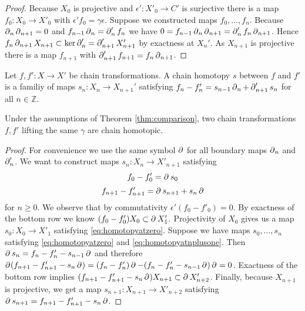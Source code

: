 \begin{proof}
Because $X_0$ is projective and $\epsilon': X'_0 \to C'$ is surjective there is a map $f_0:X_0\to X'_0$ with $\epsilon' f_0 = \gamma \epsilon$.
Suppose we constructed maps $f_0, \dots, f_n$.
Because $\operatorname{\partial}_{n}\operatorname{\partial}_{n+1} = 0$ and $f_{n-1}\operatorname{\partial}_{n}= \operatorname{\partial}_{n}'f_n$ we have $0 = f_{n-1}\operatorname{\partial}_{n}\operatorname{\partial}_{n+1} = \operatorname{\partial}_{n}'f_n\operatorname{\partial}_{n+1}$.
Hence $f_n \operatorname{\partial}_{n+1}X_{n+1} \subset \ker\operatorname{\partial}_{n}' = \operatorname{\partial}_{n+1}'X_{n+1}'$ by exactness at $X_{n}'$.
As $X_{n+1}$ is projective there is a map $f_{n+1}$ with $\operatorname{\partial}_{n+1}' f_{n+1} = f_n \operatorname{\partial}_{n+1}$.
\end{proof}
\begin{definition}
Let $f,f':X\to X'$ be chain transformations.
A chain homotopy $s$ between $f$ and $f'$ is a familiy of maps $s_n:X_n\to X_{n+1}'$ satisfying $f_n - f'_n = s_{n-1}\operatorname{\partial}_{n} + \operatorname{\partial}_{n+1}'s_n$ for all $n \in \mathbb{Z}$.
\end{definition}
\begin{lemma}
\label{lemma:comparison}
Under the assumptions of Theorem \ref{thm:comparison}, two chain transformations $f,f'$ lifting the same $\gamma$ are chain homotopic.
\end{lemma}
\begin{proof}
For convenience we use the same symbol $\operatorname{\partial}_{}$ for all boundary maps $\operatorname{\partial}_{n}$ and $\operatorname{\partial}_{n}'$.
We want to construct maps $s_n : X_n \to X'_{n+1}$ satisfying
\begin{equation}
\label{eq:homotopyatzero}
f_0 - f'_0 = \operatorname{\partial}_{} s_0
\end{equation}
\begin{equation}
\label{eq:homotopyatnplusone}
f_{n+1} - f'_{n+1} = \operatorname{\partial}_{} s_{n+1} + s_n \operatorname{\partial}_{}
\end{equation}
for $n\geq 0$.
We observe that by commutativity $\epsilon'(f_0 - f'_0)=0$.
By exactness of the bottom row we know $(f_0 - f'_0)X_0 \subset \operatorname{\partial}_{} X'_1$.
Projectivity of $X_0$ gives us a map $s_0:X_0 \to X'_1$ satisfying \eqref{eq:homotopyatzero}.
Suppose we have maps $s_0,\dots,s_n$ satisfying \eqref{eq:homotopyatzero} and \eqref{eq:homotopyatnplusone}.
Then 
$\operatorname{\partial}_{} s_n = f_n - f'_n - s_{n-1} \operatorname{\partial}_{}$
and therefore
$\operatorname{\partial}_{}(f_{n+1} - f'_{n+1} - s_n \operatorname{\partial}_{}) = ( f_n - f'_n )\operatorname{\partial}_{} - (f_n - f'_n -s_{n-1}\operatorname{\partial}_{})\operatorname{\partial}_{} = 0$.
Exactness of the bottom row implies 
$(f_{n+1} - f'_{n+1} - s_n \operatorname{\partial}_{})X_{n+1} \subset \operatorname{\partial}_{} X'_{n+2}$.
Finally, because $X_{n+1}$ is projective, we get a map 
$s_{n+1}: X_{n+1} \to X'_{n+2}$
satisfying
$\operatorname{\partial}_{} s_{n+1} = f_{n+1} - f'_{n+1} - s_n\operatorname{\partial}_{}$.
\end{proof}
